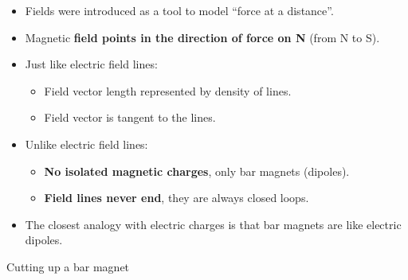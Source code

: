 \documentclass[aspectratio=169,
hyperref={colorlinks,urlcolor=blue}
]{beamer}
\begin{document}
{
\vspace{-0.25cm}
\begin{itemize}
\item Fields were introduced as a tool to model ``force at a distance''.
\item Magnetic \textbf{field points in the direction of force on N} (from N to S).
\item Just like electric field lines:
\begin{itemize}
\item Field vector length represented by density of lines.
\item Field vector is tangent to the lines.
\end{itemize}
\item Unlike electric field lines:
\begin{itemize}
\item \textbf{No isolated magnetic charges}, only bar magnets (dipoles).
\item \textbf{Field lines never end}, they are always closed loops.
\end{itemize}
\item The closest analogy with electric charges is that bar magnets are like electric dipoles.
\end{itemize}
}
{
\vspace{-1cm}
\vspace{-0.75cm}
}








\begin{frame}{Cutting up a bar magnet}

\centering
{}%
%
\end{frame}
\end{document}
